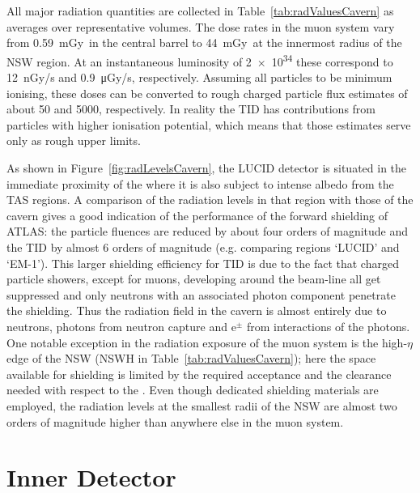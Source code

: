 \documentclass[cernpreprint, atlasdraft=false, UKenglish,british,orcidlogo, texmf, orcidlogo]{atlasdoc}
\begin{document}
All major radiation quantities  are collected in Table~\ref{tab:radValuesCavern} as averages over representative volumes.
The dose rates in the muon system vary from \SI{0.59}{\milli\gray}\perinversfb\ in the central barrel to \SI{44}{\milli\gray}\perinversfb\ at the innermost radius of the \gls{NSW}
region. At an instantaneous luminosity of \SI{2e34}{\instLumiUnit} these correspond to \SI{12}{\nano\gray/\s} and \SI{0.9}{\micro\gray/\s}, respectively. Assuming
all particles to be minimum ionising, these doses can be converted to rough charged particle flux estimates of
about \SI{50}{\instLumiUnit} 
and \SI{5000}{\instLumiUnit}, 
respectively. In reality the \gls{TID} has contributions from
particles with higher ionisation potential, which means that those estimates serve only as rough upper limits.
 
As shown in Figure~\ref{fig:radLevelsCavern}, the \gls{LUCID} detector is situated in the immediate proximity of the \beampipe where it is
also subject to intense albedo from the \gls{TAS} regions. A comparison of the radiation levels in that region with those of the cavern
gives a good indication of the performance of the forward shielding of ATLAS: the particle fluences are reduced by about four
orders of magnitude and the \gls{TID} by almost 6 orders of magnitude (e.g. comparing regions `LUCID' and `EM-1'). This larger shielding efficiency
for \gls{TID} is due to the fact that charged particle showers, except for muons, developing around the beam-line all get
suppressed and only neutrons with an associated photon component penetrate the shielding.
Thus the radiation field in the cavern is almost entirely due to neutrons, photons from neutron capture and e$^\pm$ from
interactions of the photons.
One notable exception in the radiation exposure of the muon system is the high-$\eta$ edge of the \gls{NSW}
(NSWH in Table~\ref{tab:radValuesCavern}); here the space available for shielding is limited by the required acceptance and
the clearance needed with respect to the \beampipe. Even though dedicated shielding materials are employed, the radiation levels at the
smallest radii of the \gls{NSW} are almost two orders of magnitude higher than anywhere else in the muon system.
 


\clearpage
\newpage
 
\section{Inner Detector} 
\label{sec:ID}
 
\end{document}
